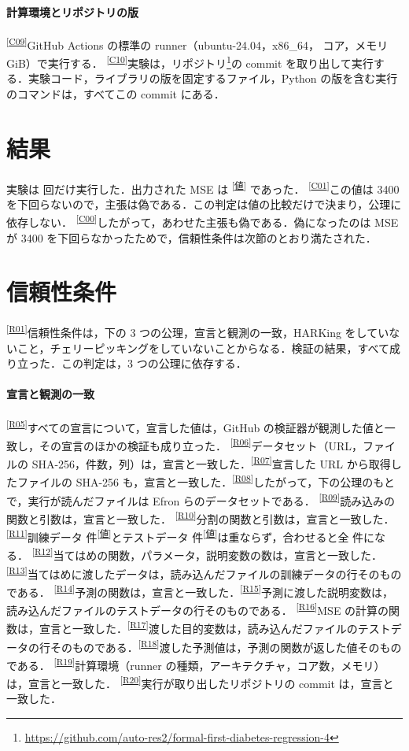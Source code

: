 \documentclass[9pt,a4paper,twocolumn]{ltjsarticle}
\newcommand{\schemaurl}{https://github.com/auto-res2/formal-first-diabetes-regression-4/blob/\SchemaCommit/formal/claims.json}
\newcommand{\cid}[1]{\textsuperscript{\textsf{\scriptsize[\href{\schemaurl\#L\csname line#1\endcsname}{#1}]}}}
\newcommand{\val}[1]{\textsuperscript{\textsf{\scriptsize[\href{\schemaurl\#L\csname line#1\endcsname}{値}]}}}
\newcommand{\code}[1]{\texttt{\small #1}}
\begin{document}
\paragraph{計算環境とリポジトリの版}
\cid{C09}GitHub Actions の標準の runner（ubuntu-24.04，x86\_64，\CpuCount{} コア，メモリ \MemoryGib{} GiB）で実行する．
\cid{C10}実験は，リポジトリ\footnote{\url{https://github.com/auto-res2/formal-first-diabetes-regression-4}}の commit \code{\RepositoryCommit} を取り出して実行する．実験コード，ライブラリの版を固定するファイル，Python の版を含む実行のコマンドは，すべてこの commit にある．

\section{結果}
\label{sec:result}

実験は \NFullRuns{} 回だけ実行した．出力された MSE は \TestMse\val{outputTestMse} であった．
\cid{C01}この値は 3400 を下回らないので，主張は偽である．この判定は値の比較だけで決まり，公理に依存しない．
\cid{C00}したがって，あわせた主張も偽である．偽になったのは MSE が 3400 を下回らなかったためで，信頼性条件は次節のとおり満たされた．

\section{信頼性条件}
\label{sec:reliability}

\cid{R01}信頼性条件は，下の 3 つの公理，宣言と観測の一致，HARKing をしていないこと，チェリーピッキングをしていないことからなる．検証の結果，すべて成り立った．この判定は，3 つの公理に依存する．

\paragraph{宣言と観測の一致}
\cid{R05}すべての宣言について，宣言した値は，GitHub の検証器が観測した値と一致し，その宣言のほかの検証も成り立った．
\cid{R06}データセット（URL，ファイルの SHA-256，件数，列）は，宣言と一致した．\cid{R07}宣言した URL から取得したファイルの SHA-256 も，宣言と一致した．\cid{R08}したがって，下の公理のもとで，実行が読んだファイルは Efron らのデータセットである．
\cid{R09}読み込みの関数と引数は，宣言と一致した．
\cid{R10}分割の関数と引数は，宣言と一致した．\cid{R11}訓練データ \NTrain{} 件\val{observedTrainIndex}とテストデータ \NTest{} 件\val{observedTestIndex}は重ならず，合わせると全 \NSamples{} 件になる．
\cid{R12}当てはめの関数，パラメータ，説明変数の数は，宣言と一致した．\cid{R13}当てはめに渡したデータは，読み込んだファイルの訓練データの行そのものである．
\cid{R14}予測の関数は，宣言と一致した．\cid{R15}予測に渡した説明変数は，読み込んだファイルのテストデータの行そのものである．
\cid{R16}MSE の計算の関数は，宣言と一致した．\cid{R17}渡した目的変数は，読み込んだファイルのテストデータの行そのものである．\cid{R18}渡した予測値は，予測の関数が返した値そのものである．
\cid{R19}計算環境（runner の種類，アーキテクチャ，コア数，メモリ）は，宣言と一致した．
\cid{R20}実行が取り出したリポジトリの commit は，宣言と一致した．
\end{document}
